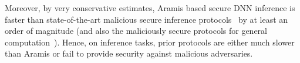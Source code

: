 Moreover, by very conservative estimates, Aramis based secure DNN inference is faster than state-of-the-art  malicious secure \mpc inference protocols~\cite{mpspdz} by at least an order of magnitude (and also the maliciously secure \mpc protocols for general computation~\cite{wrk17,wrk17b,krrw18}). Hence, on inference tasks, prior \mpc protocols are either much slower than Aramis  or fail to provide security against malicious adversaries. 
%
%

